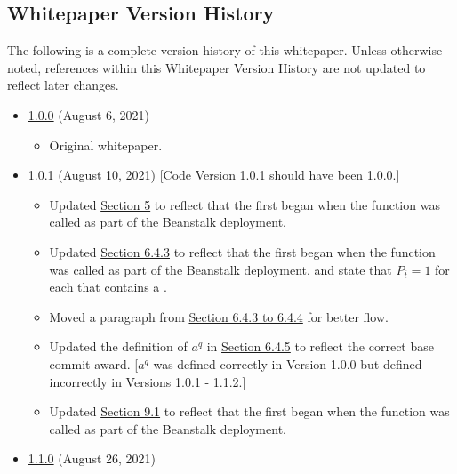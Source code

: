 \documentclass[class=article, crop=false]{standalone}
\begin{document}
\subsection{Whitepaper Version History}
The following is a complete version history of this whitepaper. Unless otherwise noted, references within this Whitepaper Version History are not updated to reflect later changes.

\begin{itemize}[topsep=0pt, itemsep=3pt,leftmargin=16pt]
    \item \href{https://github.com/BeanstalkFarms/Beanstalk-Whitepaper/blob/master/version-history/beanstalk1_0_0.pdf}{1.0.0} (August 6, 2021)
    \begin{itemize}
        \item Original whitepaper.
    \end{itemize}
    \item \href{https://github.com/BeanstalkFarms/Beanstalk-Whitepaper/blob/master/version-history/beanstalk1_0_1.pdf}{1.0.1} (August 10, 2021) [Code Version 1.0.1 should have been 1.0.0.]
    \begin{itemize}
        \item Updated \hyperlink{section.5}{Section 5} to reflect that the first  began when the  function was called as part of the Beanstalk deployment.
        \item Updated \hyperlink{subsubsection.6.4.3}{Section 6.4.3} to reflect that the first  began when the  function was called as part of the Beanstalk deployment, and state that $P_{\overline{t}} = 1$ for each  that contains a .
        \item Moved a paragraph from \hyperlink{subsubsection.6.4.3}{Section 6.4.3 to 6.4.4} for better flow.
        \item Updated the definition of $a^q$ in \hyperlink{subsubsection.6.4.5}{Section 6.4.5} to reflect the correct base commit award. [$a^q$ was defined correctly in Version 1.0.0 but defined incorrectly in Versions 1.0.1 - 1.1.2.]
        \item Updated \hyperlink{subsection.9.1}{Section 9.1} to reflect that the first  began when the  function was called as part of the Beanstalk deployment.
    \end{itemize}
    \item \href{https://github.com/BeanstalkFarms/Beanstalk-Whitepaper/blob/master/version-history/beanstalk1_1_0.pdf}{1.1.0} (August 26, 2021)

\end{itemize}
\end{document}
